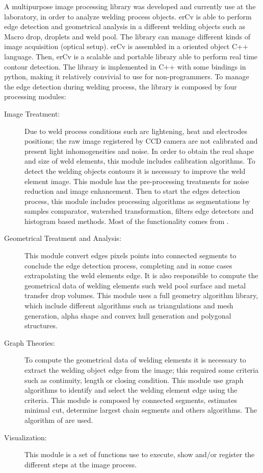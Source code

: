 \documentclass[12pt]{iopart}
\begin{document}
A multipurpose image processing library was developed 
and currently use at the laboratory, in order to analyze welding process objects.
erCv is able to perform edge detection and geometrical analysis in a different 
welding objects such as Macro drop, droplets and weld pool.
The library can manage
different kinds of image acquisition (optical setup). 
erCv is assembled in a oriented object C++ language.
Then,  erCv is a scalable 
and portable library able to perform real time
 contour detection. The library is implemented in  C++ with some bindings in python,
 making it relatively convivial to use for non-programmers.
To manage the edge detection during welding process,
the library is composed by four processing modules: 
\begin{description}
\item[Image Treatment:] Due to weld process conditions such arc lightening, 
 heat and electrodes positions; the raw image registered by CCD 
 camera are not calibrated and present light inhomogeneities and 
 noise. In order to obtain the real shape and size of weld elements, this module 
 includes calibration algorithms. To detect the welding objects contours it is 
 necessary to improve the weld element image. This module has the 
 pre-processing treatments for noise reduction and image enhancement.
 Then to start the edges detection process, this module includes processing
 algorithms as segmentations by samples comparator, watershed transformation,
 filters edge detectors and histogram based methods.  
 Most of the functionality comes from \cite{OPENCV}.
\item[Geometrical Treatment and Analysis:] This module convert edges pixels points into connected 
   segments to conclude the edge detection
  process, completing and in some cases extrapolating the weld
  elements edge. It is also responsible to compute the geometrical 
  data of welding elements such weld pool surface and metal transfer drop volumes. 
  This module uses a full geometry algorithm library\cite{CGAL}, which include different algorithms
  such as triangulations and mesh generation, alpha shape and 
  convex hull generation and polygonal structures.
\item[Graph Theories:] To compute the geometrical data of welding elements
   it is necessary to extract the welding object edge from the image; this
   required some criteria such as continuity, length or closing condition.
   This module use graph algorithms to  identify and select the welding element edge using the
   criteria. This module is composed by connected segments, estimates
   minimal cut, determine largest chain segments and others algorithms. 
   The algorithm of \cite{BOOSTGRAPH} are used.
\item[Visualization:] This module is a set of 
  functions use to execute, show and/or register the 
  different steps at the image process.
\end{description}
\end{document}
